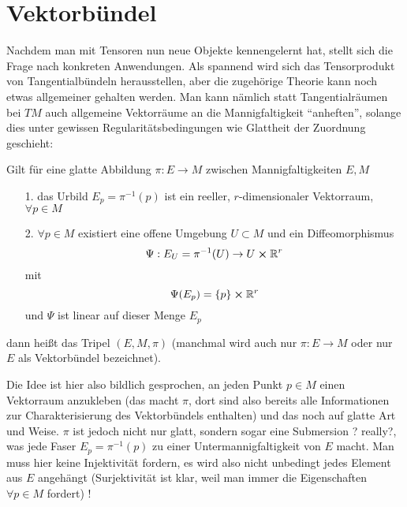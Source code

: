 \documentclass[../H_Analysis_main.tex]{subfiles}
\begin{document}
\newpage


	\section{Vektorbündel}
Nachdem man mit Tensoren nun neue Objekte kennengelernt hat, stellt sich die Frage nach konkreten Anwendungen. Als spannend wird sich das Tensorprodukt von Tangentialbündeln herausstellen, aber die zugehörige Theorie kann noch etwas allgemeiner gehalten werden. Man kann nämlich statt Tangentialräumen bei $TM$ auch allgemeine Vektorräume an die Mannigfaltigkeit \enquote{anheften}, solange dies unter gewissen Regularitätsbedingungen wie Glattheit der Zuordnung geschieht:

\begin{defi}[Vektorbündel]
Gilt für eine glatte Abbildung $\pi: E \rightarrow M$ zwischen Mannigfaltigkeiten $E, M$
\begin{itemize}
\item[1.] das Urbild $E_p = \pi^{-1}(p)$ ist ein reeller, $r$-dimensionaler Vektorraum, $\forall p \in M$

\item[2.] $\forall p \in M$ existiert eine offene Umgebung $U \subset M$ und ein Diffeomorphismus
\begin{equation}
\Psi: E_U = \pi^{-1}(U) \rightarrow U \cross \mathbb{R}^r
\end{equation}
mit
\begin{equation}
\Psi(E_p) = \qty{p} \cross \mathbb{R}^r
\end{equation}
und $\Psi$ ist linear auf dieser Menge $E_p$
\end{itemize}
dann heißt das Tripel $(E, M, \pi)$  (manchmal wird auch nur $\pi: E \rightarrow M$ oder nur $E$ als Vektorbündel bezeichnet).
\end{defi}

Die Idee ist hier also bildlich gesprochen, an jeden Punkt $p \in M$ einen Vektorraum anzukleben (das macht $\pi$, dort sind also bereits alle Informationen zur Charakterisierung des Vektorbündels enthalten) und das noch auf glatte Art und Weise. $\pi$ ist jedoch nicht nur glatt, sondern sogar eine Submersion ? really?, was jede Faser $E_p = \pi^{-1}(p)$ zu einer Untermannigfaltigkeit von $E$ macht. Man muss hier keine Injektivität fordern, es wird also nicht unbedingt jedes Element aus $E$ angehängt (Surjektivität ist klar, weil man immer die Eigenschaften $\forall p \in M$ fordert) !
\end{document}
